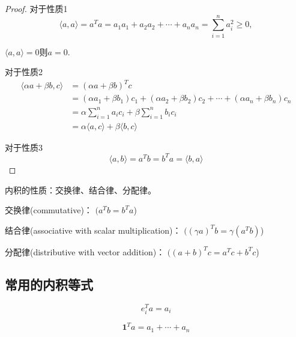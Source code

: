 \begin{proof}
对于性质1
    \begin{equation}\langle a, a\rangle=a^T a=a_{1} a_{1}+a_{2} a_{2}+\cdots+a_{n} a_{n}=\sum_{i=1}^{n} a_{i}^{2} \geq 0,\end{equation}

    $\langle a, a\rangle=0 则 a=0$.

    对于性质2
    \begin{equation}\begin{aligned} \langle\alpha a+\beta {b}, {c}\rangle 
    & = (\alpha a+\beta {b})^T c 
    \\ &=\left(\alpha a_{1}+\beta b_{1}\right) c_{1}+\left(\alpha a_{2}+\beta b_{2}\right) c_{2}+\cdots+\left(\alpha a_{n}+\beta b_{n}\right) c_{n} 
    \\ &=\alpha \sum_{i=1}^{n} a_{i} c_{i}+\beta \sum_{i=1}^{n} b_{i} c_{i}
    \\ &=\alpha\langle a, c\rangle+\beta\langle b, c\rangle\end{aligned} \end{equation}

    对于性质3
    \begin{equation} \langle a, b\rangle=a^{{T}} b=b^{{T}} a=\langle b, a\rangle \end{equation}
\end{proof}

\begin{theorem}
    内积的性质：交换律、结合律、分配律。 

交换律(commutative)： $( a^{T} b=b^{T} a $)

结合律(associative with scalar multiplication)： $( (\gamma a)^{T} b=\gamma\left(a^{T} b\right) $)

分配律(distributive with vector addition)： $( (a+b)^{T} c=a^{T} c+b^{T} c $)
\end{theorem}


\subsection{常用的内积等式}
\begin{corollary}[选出第$i$项]
    \begin{equation} e_{i}^{T} a=a_{i} \end{equation}
\end{corollary}

\begin{corollary}[向量每一项之和]
    \begin{equation} \mathbf{1}^{T} a=a_{1}+\cdots+a_{n} \end{equation}
\end{corollary}

